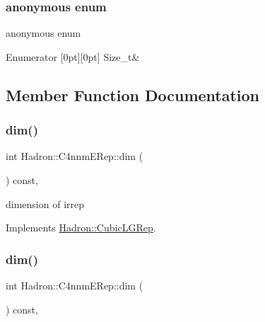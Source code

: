 \subsubsection{\texorpdfstring{anonymous enum}{anonymous enum}}
{\footnotesize\ttfamily anonymous enum}

\begin{DoxyEnumFields}{Enumerator}
[0pt][0pt]{}\mbox{\label{structHadron_1_1C4nnmERep_abd85b76d6704b9a219d18f9b13e0c525acad081a8a6c1ab83493a6d3b86d67f7e}} 
Size\+\_\+t&\\
\hline

\end{DoxyEnumFields}


\subsection{Member Function Documentation}
\mbox{\label{structHadron_1_1C4nnmERep_ae5381e6e188b515505fbd5d6a7c6e7c9}} 
\subsubsection{\texorpdfstring{dim()}{dim()}\hspace{0.1cm}{\footnotesize\ttfamily [1/3]}}
{\footnotesize\ttfamily int Hadron\+::\+C4nnm\+E\+Rep\+::dim (\begin{DoxyParamCaption}{ }\end{DoxyParamCaption}) const\hspace{0.3cm}{\ttfamily [inline]}, {\ttfamily [virtual]}}

dimension of irrep 

Implements \mbox{\hyperlink{structHadron_1_1CubicLGRep_a3acbaea26503ed64f20df693a48e4cdd}{Hadron\+::\+Cubic\+L\+G\+Rep}}.

\mbox{\label{structHadron_1_1C4nnmERep_ae5381e6e188b515505fbd5d6a7c6e7c9}} 
\subsubsection{\texorpdfstring{dim()}{dim()}\hspace{0.1cm}{\footnotesize\ttfamily [2/3]}}
{\footnotesize\ttfamily int Hadron\+::\+C4nnm\+E\+Rep\+::dim (\begin{DoxyParamCaption}{ }\end{DoxyParamCaption}) const\hspace{0.3cm}{\ttfamily [inline]}, {\ttfamily [virtual]}}

